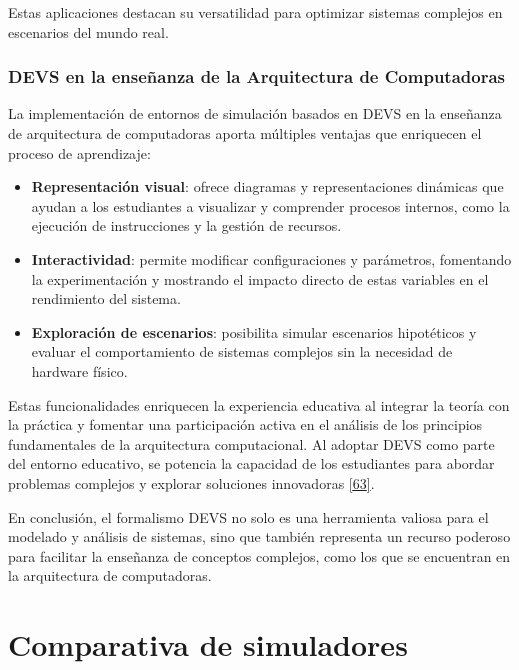 \documentclass[12pt,oneside]{templates/unerthesis}
\providecommand{\tightlist}{%
  \setlength{\itemsep}{0pt}\setlength{\parskip}{0pt}}
\begin{document}
Estas aplicaciones destacan su versatilidad para optimizar sistemas complejos en escenarios del mundo real.

\hypertarget{devs-en-la-enseuxf1anza-de-la-arquitectura-de-computadoras}{%
\subsection{DEVS en la enseñanza de la Arquitectura de Computadoras}\label{devs-en-la-enseuxf1anza-de-la-arquitectura-de-computadoras}}

La implementación de entornos de simulación basados en DEVS en la enseñanza de arquitectura de computadoras aporta múltiples ventajas que enriquecen el proceso de aprendizaje:

\begin{itemize}
\tightlist
\item
  \textbf{Representación visual}: ofrece diagramas y representaciones dinámicas que ayudan a los estudiantes a visualizar y comprender procesos internos, como la ejecución de instrucciones y la gestión de recursos.
\item
  \textbf{Interactividad}: permite modificar configuraciones y parámetros, fomentando la experimentación y mostrando el impacto directo de estas variables en el rendimiento del sistema.
\item
  \textbf{Exploración de escenarios}: posibilita simular escenarios hipotéticos y evaluar el comportamiento de sistemas complejos sin la necesidad de hardware físico.
\end{itemize}

Estas funcionalidades enriquecen la experiencia educativa al integrar la teoría con la práctica y fomentar una participación activa en el análisis de los principios fundamentales de la arquitectura computacional. Al adoptar DEVS como parte del entorno educativo, se potencia la capacidad de los estudiantes para abordar problemas complejos y explorar soluciones innovadoras \protect\hyperlink{ref-calvo_valdes_simulador_2010}{{[}63{]}}.

En conclusión, el formalismo DEVS no solo es una herramienta valiosa para el modelado y análisis de sistemas, sino que también representa un recurso poderoso para facilitar la enseñanza de conceptos complejos, como los que se encuentran en la arquitectura de computadoras.

\hypertarget{comparativa}{%
\chapter{Comparativa de simuladores}\label{comparativa}}
\end{document}
